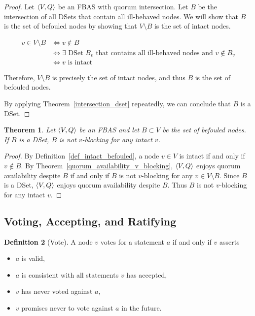 \documentclass[12pt, psamsfonts]{amsart}
\newtheorem{thm}{Theorem}[subsection]
\theoremstyle{definition}
\newtheorem{defn}[thm]{Definition}
\theoremstyle{remark}
\numberwithin{equation}{subsection}
\begin{document}
\begin{proof}
	Let $\ev{V, Q}$ be an FBAS with quorum intersection.
	Let $B$ be the intersection of all DSets that contain all ill-behaved nodes.
    We will show that $B$ is the set of befouled nodes by showing that $V \setminus B$ is the set of intact nodes.

    \begin{align*}
        v \in V \setminus B
            &\iff v \notin B \\
            &\iff \text{$\exists$ DSet $B_v$ that contains all ill-behaved nodes and $v \notin B_v$} \\
            &\iff \text{$v$ is intact}
    \end{align*}

	Therefore, $V \setminus B$ is precisely the set of intact nodes, and thus $B$ is the set of befouled nodes.

	By applying Theorem~\ref{intersection_dset} repeatedly, we can conclude that $B$ is a DSet.
\end{proof}

\begin{thm}\label{dset_v_blocking}
    Let $\ev{V, Q}$ be an FBAS and let $B \subset V$ be the set of befouled nodes.
    If $B$ is a DSet, $B$ is not $v$-blocking for any intact $v$.
\end{thm}

\begin{proof}
    By Definition~\ref{def_intact_befouled}, a node $v \in V$ is intact if and only if $v \notin B$.
    By Theorem~\ref{quorum_availability_v_blocking}, $\ev{V, Q}$ enjoys quorum availability despite $B$ if and only if $B$ is not $v$-blocking for any $v \in V \setminus B$.
    Since $B$ is a DSet, $\ev{V, Q}$ enjoys quorum availability despite $B$.
    Thus $B$ is not $v$-blocking for any intact $v$.
\end{proof}

\subsection{Voting, Accepting, and Ratifying}

\begin{defn}[Vote]\label{def_vote}
    A node $v$ votes for a statement $a$ if and only if $v$ asserts
    \begin{itemize}
        \item
            $a$ is valid,
        \item
            $a$ is consistent with all statements $v$ has accepted,
        \item
            $v$ has never voted against $a$,
        \item
            $v$ promises never to vote against $a$ in the future.
    \end{itemize}
\end{defn}
\end{document}
